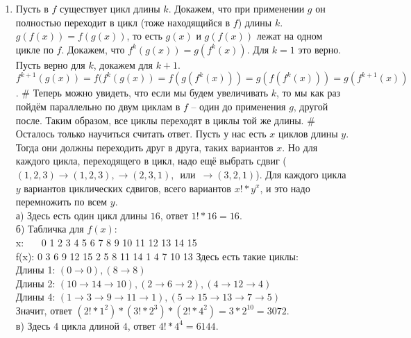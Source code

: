 \documentclass[12pt]{article} %
\begin{document}
\begin{enumerate}
  \item Пусть в $f$ существует цикл длины $k$. Докажем, что при применении $g$ он полностью переходит в цикл (тоже находящийся в $f$) длины $k$. $g(f(x)) = f(g(x))$, то есть $g(x)$ и $g(f(x))$ лежат на одном цикле по $f$. Докажем, что $f^{k}(g(x)) = g(f^{k}(x))$. Для $k = 1$ это верно. Пусть верно для $k$, докажем для $k + 1$. $f^{k + 1}(g(x)) = f(f^{k}(g(x)) = f(g(f^{k}(x))) = g(f(f^{k}(x))) = g(f^{k + 1}(x))$. \# Теперь можно увидеть, что если мы будем увеличивать $k$, то мы как раз пойдём параллельно по двум циклам в $f$ -- один до применения $g$, другой после. Таким образом, все циклы переходят в циклы той же длины. \# \\
Осталось только научиться считать ответ. Пусть у нас есть $x$ циклов длины $y$. Тогда они должны переходить друг в друга, таких вариантов $x\!$. Но для каждого цикла, переходящего в цикл, надо ещё выбрать сдвиг ($(1, 2, 3) \to (1, 2, 3), \to (2, 3, 1), $~или~$ \to (3, 2, 1)$). Для каждого цикла $y$ вариантов циклических сдвигов, всего вариантов $x! * y^x$, и это надо перемножить по всем $y$. \\
	а) Здесь есть один цикл длины $16$, ответ $1! * 16 = 16$. \\
	б) Табличка для $f(x)$: \\
x:~~~ 0 1 2 3 4 5 6 7 8 9 10 11 12 13 14 15 \\
f(x): 0 3 6 9 12 15 2 5 8 11 14 1 4  7 10 13
Здесь есть такие циклы: \\
Длины 1: $(0 \to 0), (8 \to 8)$ \\
Длины 2: $(10 \to 14 \to 10), (2 \to 6 \to 2), (4 \to 12 \to 4)$ \\
Длины 4: $(1 \to 3 \to 9 \to 11 \to 1), (5 \to 15 \to 13 \to 7 \to 5)$ \\
Значит, ответ $(2! * 1^2) * (3! * 2^3) * (2! * 4^2) = 3 * 2^10 = 3072$. \\
	в) Здесь $4$ цикла длиной $4$, ответ $4! * 4^4 = 6144$.
\end{enumerate}
\end{document}
